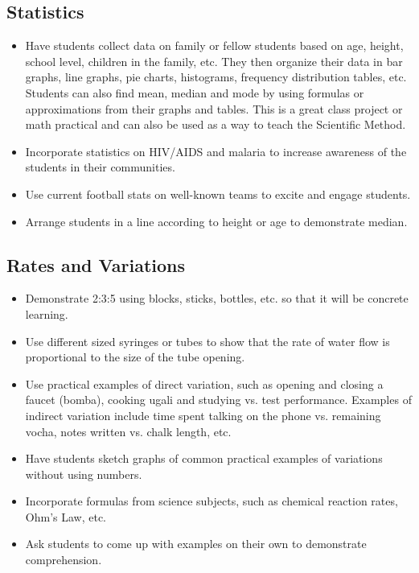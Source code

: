 	\subsection{Statistics} \label{statistics}
	\begin{itemize}
	\item Have students collect data on family or fellow students based on age, height, school level, children in the family, etc. They then organize their data in bar graphs, line graphs, pie charts, histograms, frequency distribution tables, etc. Students can also find mean, median and mode by using formulas or approximations from their graphs and tables. This is a great class project or math practical and can also be used as a way to teach the Scientific Method.
	\item Incorporate statistics on HIV\slash AIDS and malaria to increase awareness of the students in their communities.
	\item Use current football stats on well-known teams to excite and engage students.
	\item Arrange students in a line according to height or age to demonstrate median.
	\end{itemize}

	\subsection{Rates and Variations}
	\begin{itemize}
	\item Demonstrate 2:3:5 using blocks, sticks, bottles, etc. so that it will be concrete learning.
	\item Use different sized syringes or tubes to show that the rate of water flow is proportional to the size of the tube opening.
	\item Use practical examples of direct variation, such as opening and closing a faucet (bomba), cooking ugali and studying vs. test performance. Examples of indirect variation include time spent talking on the phone vs. remaining vocha, notes written vs. chalk length, etc. 
	\item Have students sketch graphs of common practical examples of variations without using numbers.
	\item Incorporate formulas from science subjects, such as chemical reaction rates, Ohm's Law, etc.
	\item Ask students to come up with examples on their own to demonstrate comprehension.
	\end{itemize}

